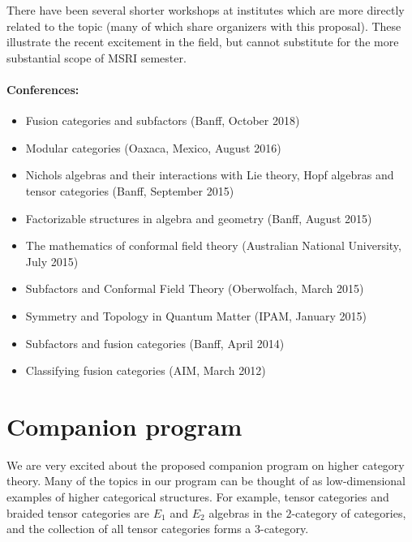 \documentclass[12pt]{article}
\begin{document}
There have been several shorter workshops at institutes which are more directly related to the topic (many of which share organizers with this proposal).  These illustrate the recent excitement in the field, but cannot substitute for the more substantial scope of MSRI semester.

\paragraph{Conferences:}
\begin{itemize}
  \setlength{\itemsep}{1pt}
  \setlength{\parskip}{0pt}
  \setlength{\parsep}{0pt}
\item Fusion categories and subfactors (Banff, October 2018)
\item Modular categories (Oaxaca, Mexico, August 2016)
\item Nichols algebras and their interactions with Lie theory, Hopf algebras and tensor categories (Banff, September 2015)
\item Factorizable structures in algebra and geometry (Banff, August 2015)
\item The mathematics of conformal field theory (Australian National University, July 2015)
\item Subfactors and Conformal Field Theory (Oberwolfach, March 2015)
\item Symmetry and Topology in Quantum Matter (IPAM, January 2015)
\item Subfactors and fusion categories (Banff, April 2014)
\item Classifying fusion categories (AIM, March 2012)
\end{itemize}

\section{Companion program}
We are very excited about the proposed companion program on higher category theory.
Many of the topics in our program can be thought of as low-dimensional examples of higher categorical structures.  For example, tensor categories and braided tensor categories are $E_1$ and $E_2$ algebras in the $2$-category of categories, and the collection of all tensor categories forms a $3$-category.
\end{document}
